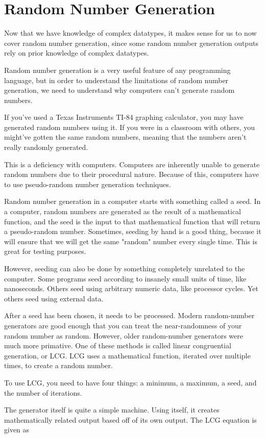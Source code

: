 \section{Random Number Generation}
Now that we have knowledge of complex datatypes, it makes sense for us to now cover random number generation, since some random number generation outputs rely on prior knowledge of complex datatypes.\par
Random number generation is a very useful feature of any programming language, but in order to understand the limitations of random number generation, we need to understand why computers can't generate random numbers.\par
If you've used a Texas Instruments TI-84 graphing calculator, you may have generated random numbers using it. If you were in a classroom with others, you might've gotten the same random numbers, meaning that the numbers aren't really randomly generated.\par
This is a deficiency with computers. Computers are inherently unable to generate random numbers due to their procedural nature. Because of this, computers have to use pseudo-random number generation techniques.\par
{}
Random number generation in a computer starts with something called a seed. In a computer, random numbers are generated as the result of a mathematical function, and the seed is the input to that mathematical function that will return a pseudo-random number. Sometimes, seeding by hand is a good thing, because it will ensure that we will get the same "random" number every single time. This is great for testing purposes.\par
However, seeding can also be done by something completely unrelated to the computer. Some programs seed according to insanely small units of time, like nanoseconds. Others seed using arbitrary numeric data, like processor cycles. Yet others seed using external data.\par
{}
After a seed has been chosen, it needs to be processed. Modern random-number generators are good enough that you can treat the near-randomness of your random number as random. However, older random-number generators were much more primative. One of these methods is called linear congruential generation, or LCG. LCG uses a mathematical function, iterated over multiple times, to create a random number.\par
To use LCG, you need to have four things: a minimum, a maximum, a seed, and the number of iterations.\par
The generator itself is quite a simple machine. Using itself, it creates mathematically related output based off of its own output. The LCG equation is given as

